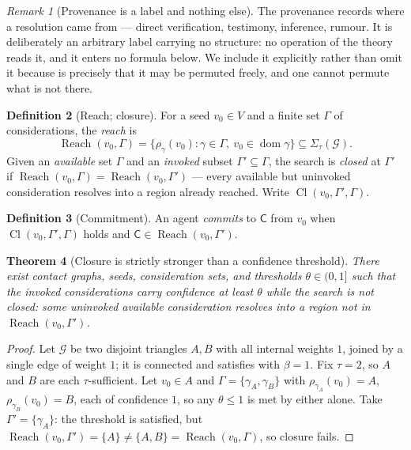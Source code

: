 \documentclass[11pt,a4paper]{article}
\theoremstyle{clstyle}
\newtheorem{theorem}{Theorem}[section]
\theoremstyle{definition}
\newtheorem{definition}[theorem]{Definition}
\theoremstyle{remark}
\newtheorem{remark}[theorem]{Remark}
\DeclareMathOperator{\Reach}{Reach}
\DeclareMathOperator{\Cl}{Cl}
\DeclareMathOperator{\dom}{dom}
\newcommand{\Gph}{\mathcal{G}}
\newcommand{\V}{V}
\newcommand{\flo}{\beta}
\newcommand{\Cell}{\mathsf{C}}
\newcommand{\Sig}{\Sigma}
\begin{document}
\begin{remark}[Provenance is a label and nothing else]
\label{rem:provenance}
The provenance records where a resolution came from --- direct verification,
testimony, inference, rumour. It is deliberately an arbitrary label carrying
no structure: no operation of the theory reads it, and it enters no formula
below. We include it explicitly rather than omit it because
 is precisely that it may be permuted freely, and one cannot
permute what is not there.
\end{remark}

\begin{definition}[Reach; closure]
\label{def:closure}
For a seed $v_0\in\V$ and a finite set $\Gamma$ of considerations, the
\emph{reach} is
\[
\Reach(v_0,\Gamma)=\{\rho_\gamma(v_0):\gamma\in\Gamma,\ v_0\in\dom\gamma\}
\subseteq\Sig_\tau(\Gph).
\]
Given an \emph{available} set $\Gamma$ and an \emph{invoked} subset
$\Gamma'\subseteq\Gamma$, the search is \emph{closed} at $\Gamma'$ if
$\Reach(v_0,\Gamma)=\Reach(v_0,\Gamma')$ --- every available but uninvoked
consideration resolves into a region already reached. Write
$\Cl(v_0,\Gamma',\Gamma)$.
\end{definition}

\begin{definition}[Commitment]
\label{def:commitment}
An agent \emph{commits} to $\Cell$ from $v_0$ when $\Cl(v_0,\Gamma',\Gamma)$
holds and $\Cell\in\Reach(v_0,\Gamma')$.
\end{definition}

\begin{theorem}[Closure is strictly stronger than a confidence threshold]
\label{thm:closure-stronger}
There exist contact graphs, seeds, consideration sets, and thresholds
$\theta\in(0,1]$ such that the invoked considerations carry confidence at
least $\theta$ while the search is not closed: some uninvoked available
consideration resolves into a region not in $\Reach(v_0,\Gamma')$.
\end{theorem}

\begin{proof}
Let $\Gph$ be two disjoint triangles $A,B$ with all internal weights $1$,
joined by a single edge of weight $1$; it is connected and satisfies
 with $\flo=1$. Fix $\tau=2$, so $A$ and $B$ are each
$\tau$-sufficient. Let $v_0\in A$ and
$\Gamma=\{\gamma_A,\gamma_B\}$ with $\rho_{\gamma_A}(v_0)=A$,
$\rho_{\gamma_B}(v_0)=B$, each of confidence $1$, so any $\theta\le1$ is met
by either alone. Take $\Gamma'=\{\gamma_A\}$: the threshold is satisfied,
but $\Reach(v_0,\Gamma')=\{A\}\neq\{A,B\}=\Reach(v_0,\Gamma)$, so closure
fails.
\end{proof}
\end{document}
